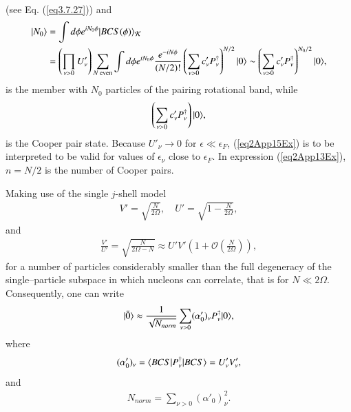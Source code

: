 \begin{subappendices}
\begin{align}
\end{align}
(see Eq. (\ref{eq3.7.27})) and
\begin{align}\label{eq2App14Ex}
\nonumber|{N_0} \rangle&=\int d\phi e^{iN_0\phi}|{BCS(\phi)} \rangle_{\mathcal K}\\
&=\left(\prod_{\nu>0}U'_\nu\right)\sum_{N \text{ even}}\int d\phi e^{iN_0\phi}\frac{e^{-iN\phi}}{(N/2)!}\left(\sum_{\nu>0}c'_\nu P_\nu^\dagger\right)^{N/2}|{0} \rangle\sim\left(\sum_{\nu>0}c'_\nu P_\nu^\dagger\right)^{N_0/2}|{0} \rangle,
\end{align}
is the member with $N_0$ particles of the pairing rotational band, while
\begin{align}\label{eq2App15Ex}
\left(\sum_{\nu>0}c'_\nu P_\nu^\dagger\right)|{0} \rangle,
\end{align}
is the Cooper pair state. Because $U'_\nu\to 0$ for $\epsilon\ll \epsilon_F$, (\ref{eq2App15Ex}) is to be interpreted to be valid for values of $\epsilon_\nu$ close to $\epsilon_F$. In expression (\ref{eq2App13Ex}), $n=N/2$ is the number of Cooper pairs.


Making use of the single $j$-shell model
\begin{align}\label{eq2App16Ex}
V'=\sqrt{\frac{N}{2\Omega}},\quad U'=\sqrt{1-\frac{N}{2\Omega}},
\end{align}
and
\begin{align}\label{eq2App17Ex}
\frac{V'}{U'}=\sqrt{\frac{N}{2\Omega-N}}\approx U'V'\left(1+\mathcal O\left(\frac{N}{2\Omega}\right)\right),
\end{align}
for a number of particles considerably smaller than the full degeneracy of the single--particle subspace in which nucleons can correlate, that is for $N\ll2\Omega$. Consequently, one can write
\begin{align}\label{eq2App18Ex}
|{\tilde 0} \rangle\approx\frac{1}{\sqrt{ N_{norm}}}\sum_{\nu>0}(\alpha'_0)_\nu P^\dagger_\nu|{0} \rangle,
\end{align}
where
\begin{align}\label{eq2App19Ex}
(\alpha'_0)_\nu =\langle {BCS|P^\dagger_\nu|BCS} \rangle=U'_\nu V'_\nu,
\end{align}
and
\begin{align}\label{eq2App20Ex}
N_{norm}=\sum_{\nu>0}(\alpha'_0)_\nu^2.
\end{align}











\end{subappendices}















% 
%
